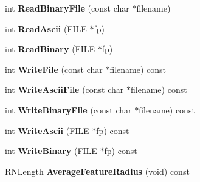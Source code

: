 \begin{DoxyCompactItemize}
\item 
int {\bfseries Read\+Binary\+File} (const char $\ast$filename)\hypertarget{struct_f_e_t_reconstruction_a992c67911a4a1daccbb731f2ac4cc539}{}\label{struct_f_e_t_reconstruction_a992c67911a4a1daccbb731f2ac4cc539}

\item 
int {\bfseries Read\+Ascii} (F\+I\+LE $\ast$fp)\hypertarget{struct_f_e_t_reconstruction_af0d455cc165a2c240f9fbe2f3cfaae5b}{}\label{struct_f_e_t_reconstruction_af0d455cc165a2c240f9fbe2f3cfaae5b}

\item 
int {\bfseries Read\+Binary} (F\+I\+LE $\ast$fp)\hypertarget{struct_f_e_t_reconstruction_a400fa875b5bdf428702edbdb9d85cda3}{}\label{struct_f_e_t_reconstruction_a400fa875b5bdf428702edbdb9d85cda3}

\item 
int {\bfseries Write\+File} (const char $\ast$filename) const \hypertarget{struct_f_e_t_reconstruction_ad76340270241b3bdfef496838c807ebf}{}\label{struct_f_e_t_reconstruction_ad76340270241b3bdfef496838c807ebf}

\item 
int {\bfseries Write\+Ascii\+File} (const char $\ast$filename) const \hypertarget{struct_f_e_t_reconstruction_a6d964745c0b8e1bb611e8fdb1112b829}{}\label{struct_f_e_t_reconstruction_a6d964745c0b8e1bb611e8fdb1112b829}

\item 
int {\bfseries Write\+Binary\+File} (const char $\ast$filename) const \hypertarget{struct_f_e_t_reconstruction_a0c600ec54c410479148b15f2e953e384}{}\label{struct_f_e_t_reconstruction_a0c600ec54c410479148b15f2e953e384}

\item 
int {\bfseries Write\+Ascii} (F\+I\+LE $\ast$fp) const \hypertarget{struct_f_e_t_reconstruction_acff24efc098ee7fd1ba6871d6550b2be}{}\label{struct_f_e_t_reconstruction_acff24efc098ee7fd1ba6871d6550b2be}

\item 
int {\bfseries Write\+Binary} (F\+I\+LE $\ast$fp) const \hypertarget{struct_f_e_t_reconstruction_a9c84a8bc5cf9a09ed4e0b57ad572b8db}{}\label{struct_f_e_t_reconstruction_a9c84a8bc5cf9a09ed4e0b57ad572b8db}

\item 
R\+N\+Length {\bfseries Average\+Feature\+Radius} (void) const \hypertarget{struct_f_e_t_reconstruction_a49d82ace6d11feb5c170905f016495c0}{}\label{struct_f_e_t_reconstruction_a49d82ace6d11feb5c170905f016495c0}


\end{DoxyCompactItemize}
